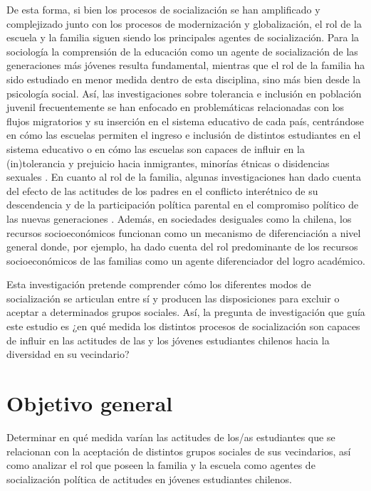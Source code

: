 \documentclass[12pt,twoside]{templates/facsothesis}
\begin{document}
De esta forma, si bien los procesos de socialización se han amplificado y complejizado junto con los procesos de modernización y globalización, el rol de la escuela y la familia siguen siendo los principales agentes de socialización. Para la sociología la comprensión de la educación como un agente de socialización de las generaciones más jóvenes resulta fundamental, mientras que el rol de la familia ha sido estudiado en menor medida dentro de esta disciplina, sino más bien desde la psicología social. Así, las investigaciones sobre tolerancia e inclusión en población juvenil frecuentemente se han enfocado en problemáticas relacionadas con los flujos migratorios y su inserción en el sistema educativo de cada país, centrándose en cómo las escuelas permiten el ingreso e inclusión de distintos estudiantes en el sistema educativo \citep{bellei_estudio_2013, ortiz_Actitudes_2016, stefoni_Educacion_2016a} o en cómo las escuelas son capaces de influir en la (in)tolerancia y prejuicio hacia inmigrantes, minorías étnicas o disidencias sexuales \citep{lee_Tolerated_2014, maurissen_Classroom_2020, trevino_Influence_2018}. En cuanto al rol de la familia, algunas investigaciones han dado cuenta del efecto de las actitudes de los padres en el conflicto interétnico de su descendencia \citep{medjedovic_intergroup_2021} y de la participación política parental en el compromiso político de las nuevas generaciones \citep{bacovsky_raising_2021}. Además, en sociedades desiguales como la chilena, los recursos socioeconómicos funcionan como un mecanismo de diferenciación a nivel general donde, por ejemplo, \citet{bellei_estudio_2013} ha dado cuenta del rol predominante de los recursos socioeconómicos de las familias como un agente diferenciador del logro académico.

Esta investigación pretende comprender cómo los diferentes modos de socialización se articulan entre sí y producen las disposiciones para excluir o aceptar a determinados grupos sociales. Así, la pregunta de investigación que guía este estudio es ¿en qué medida los distintos procesos de socialización son capaces de influir en las actitudes de las y los jóvenes estudiantes chilenos hacia la diversidad en su vecindario?

\hypertarget{objetivo-general}{%
\section{Objetivo general}\label{objetivo-general}}

Determinar en qué medida varían las actitudes de los/as estudiantes que se relacionan con la aceptación de distintos grupos sociales de sus vecindarios, así como analizar el rol que poseen la familia y la escuela como agentes de socialización política de actitudes en jóvenes estudiantes chilenos.
\end{document}
